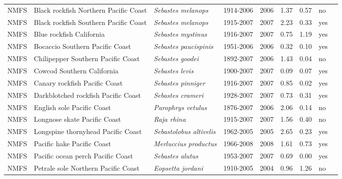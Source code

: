 \begin{longtable}{p{1.8cm}p{4cm}p{4cm}ccccp{1.9cm}c}
  NMFS & Black rockfish Northern Pacific Coast & \textit{Sebastes melanops} & 1914-2006 & 2006 & 1.37 & 0.57 & no & \cite{NWFSC-BLACKROCKNPCOAST-1914-2006-BRANCH} \\ 
  NMFS & Black rockfish Southern Pacific Coast & \textit{Sebastes melanops} & 1915-2007 & 2007 & 2.23 & 0.33 & yes & \cite{NWFSC-BLACKROCKSPCOAST-1915-2007-BRANCH} \\ 
  NMFS & Blue rockfish California & \textit{Sebastes mystinus} & 1916-2007 & 2007 & 0.75 & 1.19 & yes & \cite{NWFSC-BLUEROCKCAL-1916-2007-BRANCH} \\ 
  NMFS & Bocaccio Southern Pacific Coast & \textit{Sebastes paucispinis} & 1951-2006 & 2006 & 0.32 & 0.10 & yes & \cite{NWFSC-BOCACCSPCOAST-1951-2006-BRANCH} \\ 
  NMFS & Chilipepper Southern Pacific Coast & \textit{Sebastes goodei} & 1892-2007 & 2006 & 1.43 & 0.04 & no & \cite{NWFSC-CHILISPCOAST-1892-2007-BRANCH} \\ 
  NMFS & Cowcod Southern California & \textit{Sebastes levis} & 1900-2007 & 2007 & 0.09 & 0.07 & yes & \cite{NWFSC-COWCODSCAL-1900-2007-BRANCH} \\ 
  NMFS & Canary rockfish Pacific Coast & \textit{Sebastes pinniger} & 1916-2007 & 2007 & 0.85 & 0.02 & yes & \cite{NWFSC-CROCKPCOAST-1916-2007-BRANCH} \\ 
  NMFS & Darkblotched rockfish Pacific Coast & \textit{Sebastes crameri} & 1928-2007 & 2007 & 0.73 & 0.31 & yes & \cite{NWFSC-DKROCKPCOAST-1928-2007-BRANCH} \\ 
  NMFS & English sole Pacific Coast & \textit{Parophrys vetulus} & 1876-2007 & 2006 & 2.06 & 0.14 & no & \cite{NWFSC-ESOLEPCOAST-1876-2007-BRANCH} \\ 
  NMFS & Longnose skate Pacific Coast & \textit{Raja rhina} & 1915-2007 & 2007 & 1.56 & 0.40 & no & \cite{NWFSC-LNOSESKAPCOAST-1915-2007-BRANCH} \\ 
  NMFS & Longspine thornyhead Pacific Coast & \textit{Sebastolobus altivelis} & 1962-2005 & 2005 & 2.65 & 0.23 & yes & \cite{NWFSC-LSTHORNHPCOAST-1962-2005-STANTON} \\ 
  NMFS & Pacific hake Pacific Coast & \textit{Merluccius productus} & 1966-2008 & 2008 & 1.61 & 0.73 & yes & \cite{NWFSC-PHAKEPCOAST-1966-2008-BRANCH} \\ 
  NMFS & Pacific ocean perch Pacific Coast & \textit{Sebastes alutus} & 1953-2007 & 2007 & 0.69 & 0.00 & yes & \cite{NWFSC-POPERCHPCOAST-1953-2007-BRANCH} \\ 
  NMFS & Petrale sole Northern Pacific Coast & \textit{Eopsetta jordani} & 1910-2005 & 2004 & 0.96 & 1.26 & no & \cite{NWFSC-PSOLENPCOAST-1910-2005-STANTON} \\ 

\end{longtable}
